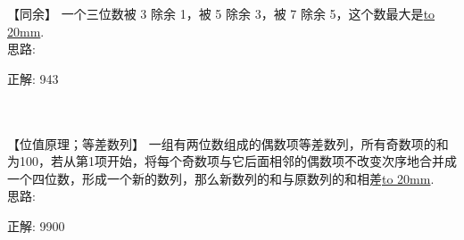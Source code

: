 \item {
    【同余】
    一个三位数被 3 除余 1，被 5 除余 3，被 7 除余 5，这个数最大是\underline{\hbox to 20mm{}}.
    \ifshowSolution
        \fangsong{}
        \\
        思路:

        正解: 943
    \else
        \\ \\ \\
    \fi
}


\item {
    【位值原理；等差数列】
    一组有两位数组成的偶数项等差数列，所有奇数项的和为100，若从第1项开始，将每个奇数项与它后面相邻的偶数项不改变次序地合并成一个四位数，形成一个新的数列，那么新数列的和与原数列的和相差\underline{\hbox to 20mm{}}.
    \ifshowSolution
        \fangsong{}
        \\
        思路:

        正解: 9900
    \else
        \\ \\ \\
    \fi
}
